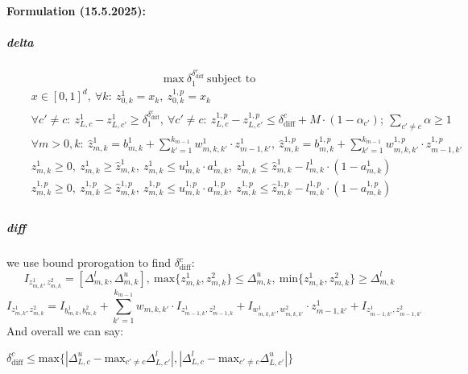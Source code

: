 \documentclass[11pt]{article}
\newcommand{\Dana}[1]{\textcolor{purple}{\bf Dana: #1}}
\begin{document}
\paragraph{Formulation (15.5.2025):}
\subparagraph{delta}
$$ \text{max}\ \delta_{1}^{\delta_{\text{diff}}^{c}}\ \text{subject to} $$
\begin{align*}
\tag{a}\quad & x\in{[0,1]^d},\ \forall{k}:\ z_{0,k}^1=x_k,\ {z_{0,k}^{1,p}}=x_k\\
\tag{b}\quad & \forall{c'\ne{c}}:\ {z_{L,c}^1}-{z_{L,c'}^1}\geq\delta_{1}^{\delta_{\text{diff}}^{c}},\   \forall{c'\ne{c}}:\ {z_{L,c}^{1,p}}-{z_{L,c'}^{1,p}}\leq{\delta_{\text{diff}}^c+M\cdot{(1-\alpha_{c'})}};\ \sum_{c'\ne{c}}{\alpha}\geq{1}\\
\tag{c}\quad &  \forall{m>0,k}:\ \hat{z}_{m,k}^1=b_{m,k}^1+\sum_{k'=1}^{k_{m-1}}{w_{m,k,k'}^1\cdot{z_{m-1,k'}^1}},\ \hat{z}_{m,k}^{1,p}=b_{m,k}^{1,p}+\sum_{k'=1}^{k_{m-1}}{w_{m,k,k'}^{1,p}\cdot{z_{m-1,k'}^{1,p}}}  \\
\tag{d}\quad & z_{m,k}^{1}\geq{0},\ z_{m,k}^{1}\geq{\hat{z}_{m,k}^{1}},\ z_{m,k}^{1}\leq{u_{m,k}^{1}\cdot{a_{m,k}^{1}}},\ z_{m,k}^{1}\leq{\hat{z}_{m,k}^{1}-l_{m,k}^{1}\cdot{(1-a_{m,k}^{1})}}\\ 
\quad & z_{m,k}^{1,p}\geq{0},\ z_{m,k}^{1,p}\geq{\hat{z}_{m,k}^{1,p}},\ z_{m,k}^{1,p}\leq{u_{m,k}^{1,p}\cdot{a_{m,k}^{1,p}}},\ z_{m,k}^{1,p}\leq{\hat{z}_{m,k}^{1,p}-l_{m,k}^{1,p}\cdot{(1-a_{m,k}^{1,p})}} 
    \\
\end{align*}

\subparagraph{diff}
we use bound prorogation to find $\delta_\text{diff}^c$:
$$I_{z_{m,k}^1,z_{m,k}^2}=[\Delta_{m,k}^l,\Delta_{m,k}^u],\ \text{max}\{z_{m,k}^1,z_{m,k}^2\}\leq{\Delta_{m,k}^u},\ \text{min}\{z_{m,k}^1,z_{m,k}^2\}\geq{\Delta_{m,k}^l}$$
$$
I_{z_{m,k}^1,z_{m,k}^2}=I_{b_{m,k}^1,b_{m,k}^2}+\sum_{k'=1}^{k_{m-1}}{w_{m,k,k'}\cdot{I_{z_{m-1,k}^1,z_{m-1,k}^2}}+I_{w_{m,k,k'}^1,w_{m,k,k'}^2}\cdot{z_{m-1,k'}^1+I_{z_{m-1,k'}^1,z_{m-1,k'}^2}} }
$$
And overall we can say:

$\delta_{\text{diff}}^c\leq{\text{max}\{|\Delta_{L,c}^u-\text{max}_{c'\ne{c}}{\Delta_{L,c'}^l}|,|\Delta_{L,c}^l-\text{max}_{c'\ne{c}}{\Delta_{L,c'}^u}|\}}$
   
\end{document}
